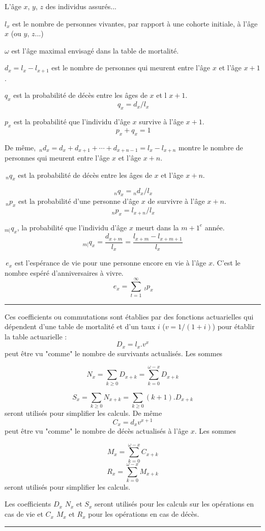 
\begin{f}

L'âge $x$, $y$, $z$ des individus assurés...    

$l_x$ est le nombre de personnes vivantes, par rapport à une cohorte initiale, à l'âge $x$ (ou $y$, $z$...)

$\omega$ est l'âge maximal envisagé dans la table de mortalité.

$d_x=l_x-l_{x+1}$ est le nombre de personnes qui meurent entre l'âge $x$ et l'âge $x+1$.

$q_x$ est la probabilité de décès entre les âges de $x$ et l $x+1$.
$$
\,q_x = d_x / l_x 
$$

$p_x$ est la probabilité que l'individu  d'âge $x$ survive à l'âge $x+1$.
$$
\,p_x+q_x=1 
$$

De même, 
$\,_nd_x = d_x + d_{x+1} + \cdots + d_{x+n-1} = l_x - l_{x+n}$ montre le nombre de personnes qui meurent entre l'âge $x$ et l'âge $x+n$.

$\,_nq_x$ est la probabilité de décès entre les âges de $x$ et l'âge $x+n$.

$$
\,_nq_x = {}_nd_x / l_x
$$
$\,_np_x$ est la probabilité d'une personne d'âge $x$ de survivre à l'âge $x+n$.
$$
\,_np_x = l_{x+n} / l_x 
$$


${}_{m|}q_{x}$, la probabilité que l'individu d'âge $x$ meurt dans la ${m+1}^e$ année.
$${}_{m|}q_{x}=\frac{d_{x+m}}{l_x}=\frac{l_{x+m}-l_{x+m+1}}{l_x}$$

$\,e_x$  est l'espérance de vie pour une personne encore en vie à l'âge $x$. 
C'est le nombre espéré d'anniversaires à vivre.
$$
\,e_x = \sum_{t=1}^{\infty} \ _tp_x 
$$
\end{f}
\hrule

\begin{f}


Ces coefficients ou commutations sont établies par des fonctions actuarielles qui dépendent d'une table de mortalité et d'un taux $i$ ($v=1/(1+i)$) pour établir la table actuarielle :
$$
D_x=l_x .v^x
$$
peut être vu "comme" le nombre de survivants actualisés. Les sommes 

$$
N_x=\sum_{k\geq 0} D_{x+k}=\sum_{k= 0}^{\omega-x} D_{x+k}
$$

$$
S_x=\sum_{k\geq 0} N_{x+k}=\sum_{k\geq 0}(k+1). D_{x+k}
$$
seront utilisés pour simplifier les calculs.
De même
$$
C_x = d_x v^{ x+1} 
$$
peut être vu "comme" le nombre de décès  actualisés à l'âge $x$. Les sommes

$$
M_x=\sum_{k= 0}^{\omega-x} C_{x+k}
$$
$$
R_x=\sum_{k= 0}^{\omega-x} M_{x+k}
$$
seront utilisés pour simplifier les calculs.

Les  coefficients $D_x$ $N_x$ et $S_x$ seront utilisés pour les calculs sur les opérations en cas de vie et $C_x$ $M_x$ et $R_x$  pour les opérations en cas de décès.

\end{f} 
\hrule

